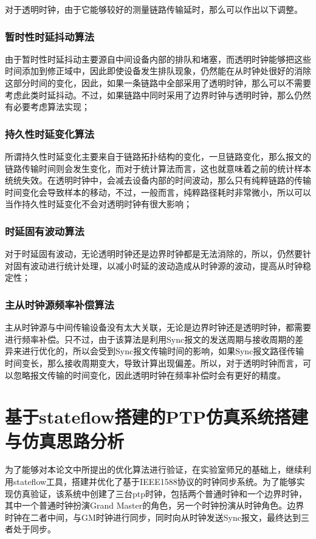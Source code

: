 对于透明时钟，由于它能够较好的测量链路传输延时，那么可以作出以下调整。
\subsubsection{暂时性时延抖动算法}
由于暂时性时延抖动主要源自中间设备内部的排队和堵塞，而透明时钟能够把这些时间添加到修正域中，因此即使设备发生排队现象，仍然能在从时钟处很好的消除这部分时间的变化，因此，如果一条链路中全部采用了透明时钟，那么可以不需要考虑此类时延抖动。不过，如果链路中同时采用了边界时钟与透明时钟，那么仍然有必要考虑算法实现；

\subsubsection{持久性时延变化算法}
所谓持久性时延变化主要来自于链路拓扑结构的变化，一旦链路变化，那么报文的链路传输时间则会发生变化，而对于统计算法而言，这也就意味着之前的统计样本统统失效。在透明时钟中，会减去设备内部的时间波动，那么只有纯粹链路的传输时间变化会导致样本的移动，不过，一般而言，纯粹路径耗时非常微小，所以可以当作持久性时延变化不会对透明时钟有很大影响；

\subsubsection{时延固有波动算法}
对于时延固有波动，无论透明时钟还是边界时钟都是无法消除的，所以，仍然要针对固有波动进行统计处理，以减小时延的波动造成从时钟源的波动，提高从时钟稳定性；

\subsubsection{主从时钟源频率补偿算法}
主从时钟源与中间传输设备没有太大关联，无论是边界时钟还是透明时钟，都需要进行频率补偿。只不过，由于该算法是利用Sync报文的发送周期与接收周期的差异来进行优化的，所以会受到Sync报文传输时间的影响，如果Sync报文路径传输时间变长，那么接收周期变大，导致计算出现偏差。所以，对于透明时钟而言，可以忽略报文传输的时间变化，因此透明时钟在频率补偿时会有更好的精度。

\section{基于stateflow搭建的PTP仿真系统搭建与仿真思路分析}
为了能够对本论文中所提出的优化算法进行验证，在实验室师兄的基础上，继续利用stateflow工具，搭建并优化了基于IEEE1588协议的时钟同步系统。为了能够实现仿真验证，该系统中创建了三台ptp时钟，包括两个普通时钟和一个边界时钟，其中一个普通时钟扮演Grand Master的角色，另一个时钟扮演从时钟角色。边界时钟在二者中间，与GM时钟进行同步，同时向从时钟发送Sync报文，最终达到三者处于同步。

